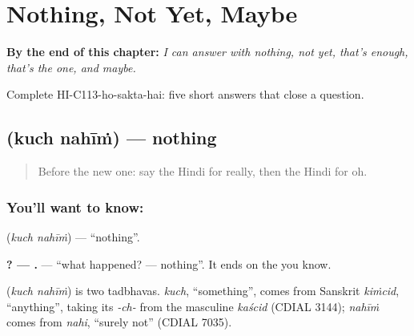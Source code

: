 
\chapter{Nothing, Not Yet, Maybe}
\label{ch:hi-nothing-not-yet}

\begin{chapteropening}
\textbf{By the end of this chapter:} \emph{I can answer with nothing, not yet, that's enough, that's the one, and maybe.}

Complete HI-C113-ho-sakta-hai: five short answers that close a question.
\end{chapteropening}

\section[\texorpdfstring{\hi{कुछ} \hi{नहीं} (kuch nahīṁ)}{कुछ नहीं (kuch nahīṁ)}]{  (kuch nahīṁ) — nothing}

\label{lesson:HI-C113-kuchnahin}



\begin{quote}
Before the new one: say the Hindi for really, then the Hindi for oh.
\end{quote}

\subsection*{You'll want to know:  }
\textbf{ } (\emph{kuch nahīṁ}) — \textquotedblleft{}nothing\textquotedblright{}.

\textbf{ ? —  .} — \textquotedblleft{}what happened? — nothing\textquotedblright{}. It ends on the \textbf{} you know.

\begin{cousinweb}
\textbf{ } (\emph{kuch nahīṁ}) is two tadbhavas. \emph{kuch}, \textquotedblleft{}something\textquotedblright{}, comes from Sanskrit \emph{kiṁcid}, \textquotedblleft{}anything\textquotedblright{}, taking its \emph{-ch-} from the masculine \emph{kaścid} (CDIAL 3144); \emph{nahīṁ} comes from \emph{nahi}, \textquotedblleft{}surely not\textquotedblright{} (CDIAL 7035).
\end{cousinweb}

